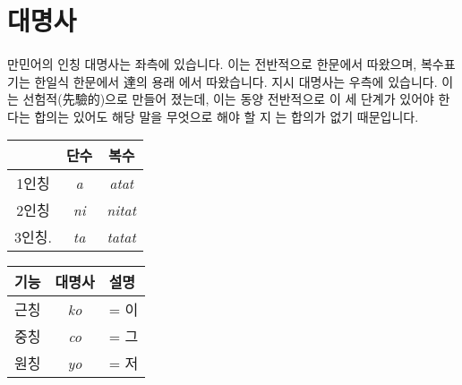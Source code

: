 \documentclass{book}
\begin{document}
    \section{대명사}
    \paragraph{}
    만민어의 인칭 대명사는 좌측에 있습니다. 이는 전반적으로 한문에서 따왔으며, 복수표기는 한일식 한문에서 達의 용래 에서 따왔습니다. 지시 대명사는 우측에 있습니다. 이는 선험적(先驗的)으로 만들어 졌는데, 이는 동양 전반적으로 이 세 단계가 있어야 한다는 합의는 있어도 해당 말을 무엇으로 해야 할 지 는 합의가 없기 때문입니다. 
        \begin{center}\footnotesize{}
            \begin{tabular}{|c|c|c|} \hline
                 & 단수 & 복수 \\ \hline
                 1인칭 & \textit{a} & \textit{atat} \\ \hline
                 2인칭 & \textit{ni} & \textit{nitat} \\ \hline
                 3인칭. & \textit{ta} & \textit{tatat} \\ \hline
            \end{tabular}
            \begin{tabular}{|c|c|l|} \hline
                기능 &  대명사 & 설명 \\ \hline
                근칭 & \textit{ko} & = 이 \\ \hline
                중칭  & \textit{co} & = 그\\ \hline
                원칭  & \textit{yo} & = 저 \\ \hline
            \end{tabular}
        \end{center} \normalsize{}
\end{document}
